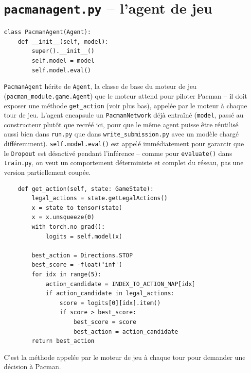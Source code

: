 \documentclass[a4paper,12pt]{article}
\begin{document}
\newpage
\section{\texttt{pacmanagent.py} -- l'agent de jeu}

\begin{lstlisting}
class PacmanAgent(Agent):
    def __init__(self, model):
        super().__init__()
        self.model = model
        self.model.eval()
\end{lstlisting}

\texttt{PacmanAgent} hérite de \texttt{Agent}, la classe de base du
moteur de jeu (\texttt{pacman\_module.game.Agent}) que le moteur attend
pour piloter Pacman -- il doit exposer une méthode \texttt{get\_action}
(voir plus bas), appelée par le moteur à chaque tour de jeu.
L'agent encapsule un \texttt{PacmanNetwork} déjà entraîné (\texttt{model},
passé au constructeur plutôt que recréé ici, pour que le même agent
puisse être réutilisé aussi bien dans \texttt{run.py} que dans
\texttt{write\_submission.py} avec un modèle chargé différemment).
\texttt{self.model.eval()} est appelé immédiatement pour garantir que le
\texttt{Dropout} est désactivé pendant l'inférence -- comme pour
\texttt{evaluate()} dans \texttt{train.py}, on veut un comportement
déterministe et complet du réseau, pas une version partiellement coupée.

\begin{lstlisting}
    def get_action(self, state: GameState):
        legal_actions = state.getLegalActions()
        x = state_to_tensor(state)
        x = x.unsqueeze(0)
        with torch.no_grad():
            logits = self.model(x)

        best_action = Directions.STOP
        best_score = -float('inf')
        for idx in range(5):
            action_candidate = INDEX_TO_ACTION_MAP[idx]
            if action_candidate in legal_actions:
                score = logits[0][idx].item()
                if score > best_score:
                    best_score = score
                    best_action = action_candidate
        return best_action
\end{lstlisting}

C'est la méthode appelée par le moteur de jeu à chaque tour pour demander
une décision à Pacman.
\end{document}
